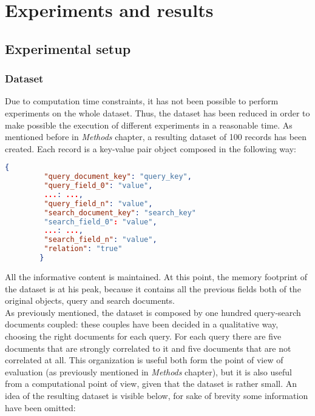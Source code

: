 \documentclass[\main/main.tex]{subfiles}
\begin{document}
\chapter{Experiments and results}
\section{Experimental setup}
\subsection{Dataset}
Due to computation time constraints, it has not been possible to perform experiments on the whole dataset. Thus, the dataset has been reduced in order to make possible the execution of different experiments in a reasonable time. As mentioned before in \textit{Methods} chapter, a resulting dataset of 100 records has been created. Each record is a key-value pair object composed in the following way:
\begin{center}
    \begin{lstlisting}[language=json, caption="Experimental dataset object", captionpos=b]
        {
         "query_document_key": "query_key",
         "query_field_0": "value",
         ...: ...,
         "query_field_n": "value",
         "search_document_key": "search_key"
         "search_field_0": "value",
         ...: ...,
         "search_field_n": "value",
         "relation": "true"
        }
    \end{lstlisting}
\end{center}
All the informative content is maintained. At this point, the memory footprint of the dataset is at his peak, because it contains all the previous fields both of the original objects, query and search documents.\\
As previously mentioned, the dataset is composed by one hundred query-search documents coupled: these couples have been decided in a qualitative way, choosing the right documents for each query. For each query there are five documents that are strongly correlated to it and five documents that are not correlated at all. This organization is useful both form the point of view of evaluation (as previously mentioned in \textit{Methods} chapter), but it is also useful from a computational point of view, given that the dataset is rather small.
An idea of the resulting dataset is visible below, for sake of brevity some information have been omitted:
\end{document}
